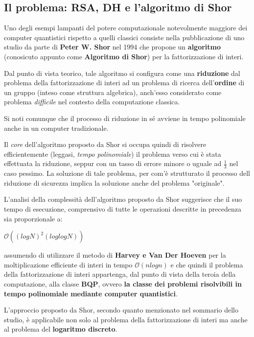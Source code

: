 \documentclass[a4paper, 12pt, oneside]{article}
\theoremstyle{definition}
\begin{document}
\newpage

\subsection{Il problema: RSA, DH e l'algoritmo di Shor}
Uno degli esempi lampanti del potere computazionale notevolmente maggiore dei computer quantistici rispetto a quelli classici consiste nella pubblicazione di uno studio \cite{365700} da parte di \textbf{Peter W. Shor} nel 1994 che propone un \textbf{algoritmo} (conosicuto appunto come \textbf{Algoritmo di Shor}) per la fattorizzazione di interi.

Dal punto di vista teorico, tale algoritmo si configura come una \textbf{riduzione} dal problema della fattorizzazione di interi ad un problema di ricerca dell'\textbf{ordine} di un gruppo (inteso come struttura algebrica), anch'esso considerato come problema \textit{difficile} nel contesto della computazione classica. 

Si noti comunque che il processo di riduzione in sé avviene in tempo polinomiale anche in un computer tradizionale. 

Il \textit{core} dell'algoritmo proposto da Shor si occupa quindi di risolvere efficientemente (leggasi, \textit{tempo polinomiale}) il problema verso cui è stata effettuata la riduzione, seppur con un tasso di errore minore o uguale ad $\frac{1}{3}$ nel caso pessimo. La soluzione di tale problema, per com'è strutturato il processo dell riduzione di sicurezza implica la soluzione anche del problema "originale".

L'analisi della complessità dell'algoritmo proposto da Shor suggerisce che il suo tempo di esecuzione, comprensivo di tutte le operazioni descritte in precedenza sia proporzionale a:

\begin{center}
    $\mathcal{O}((log{}N)^2 (log{}log{}N))$
\end{center}

assumendo di utilizzare il metodo di \textbf{Harvey e Van Der Hoeven} \cite{harvey:hal-02070778} per la moltiplicazione efficiente di interi in tempo $\mathcal{O}(n log{}n)$ e che quindi il problema della fattorizzazione di interi appartenga, dal punto di vista della teroia della computazione, alla classe \textbf{BQP}, ovvero \textbf{la classe dei problemi risolvibili in tempo polinomiale mediante computer quantistici}.

L'approccio proposto da Shor, secondo quanto menzionato nel sommario dello studio, è applicabile non solo al problema della fattorizzazione di interi ma anche al problema del \textbf{logaritmo discreto}.
\end{document}
